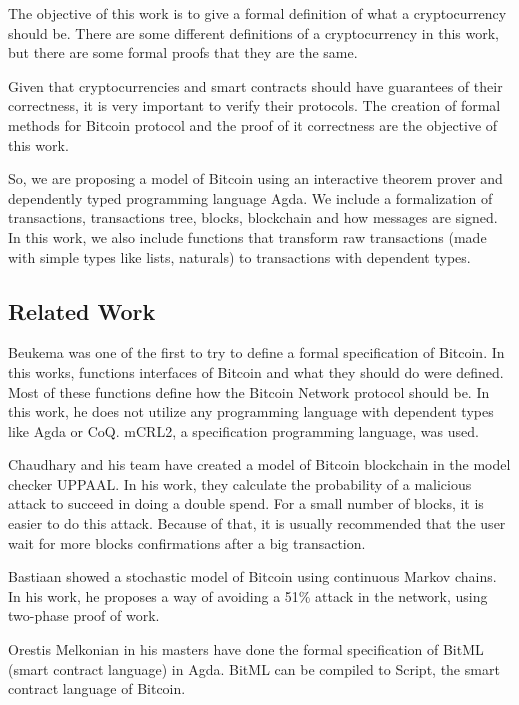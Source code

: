 The objective of this work is to give a formal definition of what a cryptocurrency should be.
There are some different definitions of a cryptocurrency in this work,
but there are some formal proofs that they are the same.

Given that cryptocurrencies and smart contracts should have guarantees of their correctness,
it is very important to verify their protocols.
The creation of formal methods for Bitcoin protocol and the proof of it correctness are
the objective of this work.

So, we are proposing a model of Bitcoin using an interactive theorem prover and dependently
typed programming language Agda.
We include a formalization of transactions, transactions tree, blocks, blockchain and
how messages are signed.
In this work, we also include functions that transform raw transactions (made with simple types like
lists, naturals) to transactions with dependent types.

\subsection{Related Work}

Beukema \cite{beukema2014formalising} was one of the first to try
to define a formal specification of Bitcoin.
In this works, functions interfaces of Bitcoin and what they should do were defined.
Most of these functions define how the Bitcoin Network protocol should be.
In this work, he does not utilize any programming language with dependent types like Agda or CoQ.
mCRL2, a specification programming language, was used.

Chaudhary and his team \cite{chaudhary2015modeling} have created a model of Bitcoin blockchain
in the model checker UPPAAL.
In his work, they calculate the probability of a malicious attack to succeed in doing a double spend.
For a small number of blocks, it is easier to do this attack.
Because of that, it is usually recommended that the user wait for more blocks confirmations
after a big transaction.

Bastiaan \cite{bastiaan2015preventing} showed a stochastic model of Bitcoin using
continuous Markov chains.
In his work, he proposes a way of avoiding a 51\% attack in the network,
using two-phase proof of work.

Orestis Melkonian \cite{melkonian2019formalizing} in his masters have done the formal specification
of BitML (smart contract language) in Agda.
BitML can be compiled to Script, the smart contract language of Bitcoin. 

